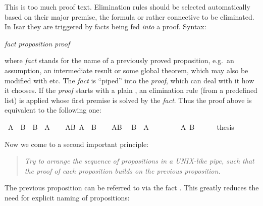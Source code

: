 \begin{isabellebody}
\begin{isamarkuptext}
This is too much proof text. Elimination rules should be selected
automatically based on their major premise, the formula or rather connective
to be eliminated. In Isar they are triggered by facts being fed
\emph{into} a proof. Syntax:
\begin{center}
 \emph{fact}  \emph{proposition} \emph{proof}
\end{center}
where \emph{fact} stands for the name of a previously proved
proposition, e.g.\ an assumption, an intermediate result or some global
theorem, which may also be modified with  etc.
The \emph{fact} is ``piped'' into the \emph{proof}, which can deal with it
how it chooses. If the \emph{proof} starts with a plain ,
an elimination rule (from a predefined list) is applied
whose first premise is solved by the \emph{fact}. Thus the proof above
is equivalent to the following one:%
\end{isamarkuptext}%
\isamarkuptrue%
\isamarkupfalse%
\ {\isachardoublequoteopen}A\ {\isasymand}\ B\ {\isasymlongrightarrow}\ B\ {\isasymand}\ A{\isachardoublequoteclose}\isanewline
%
\isadelimproof
%
\endisadelimproof
%
\isatagproof
{}\isamarkupfalse%
\isanewline
\ \ \isamarkupfalse%
\ AB{\isacharcolon}\ {\isachardoublequoteopen}A\ {\isasymand}\ B{\isachardoublequoteclose}\isanewline
\ \ \isamarkupfalse%
\ AB\ \isamarkupfalse%
\ {\isachardoublequoteopen}B\ {\isasymand}\ A{\isachardoublequoteclose}\isanewline
\ \ \isamarkupfalse%
\isanewline
\ \ \ \ \isamarkupfalse%
\ {\isachardoublequoteopen}A{\isachardoublequoteclose}\ {\isachardoublequoteopen}B{\isachardoublequoteclose}\isanewline
\ \ \ \ \isamarkupfalse%
\ {\isacharquery}thesis\ \isacommand{{\isachardot}{\isachardot}}\isamarkupfalse%
\isanewline
\ \ \isamarkupfalse%
\isanewline
{}\isamarkupfalse%
%
\endisatagproof
{\isafoldproof}%
%
\isadelimproof
%
\endisadelimproof
%
\begin{isamarkuptext}%
Now we come to a second important principle:
\begin{quote}\em
Try to arrange the sequence of propositions in a UNIX-like pipe,
such that the proof of each proposition builds on the previous proposition.
\end{quote}
The previous proposition can be referred to via the fact .
This greatly reduces the need for explicit naming of propositions:%
\end{isamarkuptext}%

\end{isabellebody}
